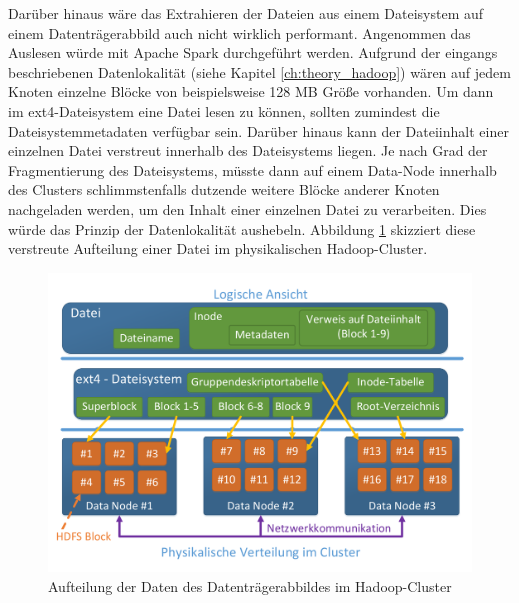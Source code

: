 \noindent
Darüber hinaus wäre das Extrahieren der Dateien aus einem Dateisystem auf einem Datenträgerabbild auch nicht wirklich performant. Angenommen das Auslesen würde mit Apache Spark durchgeführt werden. Aufgrund der eingangs beschriebenen Datenlokalität (siehe Kapitel \ref{ch:theory_hadoop}) wären auf jedem Knoten einzelne Blöcke von beispielsweise 128 MB Größe vorhanden. Um dann im ext4-Dateisystem eine Datei lesen zu können, sollten zumindest die Dateisystemmetadaten verfügbar sein. Darüber hinaus kann der Dateiinhalt einer einzelnen Datei verstreut innerhalb des Dateisystems liegen. Je nach Grad der Fragmentierung des Dateisystems, müsste dann auf einem Data-Node innerhalb des Clusters schlimmstenfalls dutzende weitere Blöcke anderer Knoten nachgeladen werden, um den Inhalt einer einzelnen Datei zu verarbeiten. Dies würde das Prinzip der Datenlokalität aushebeln. Abbildung \ref{fig:ext4_to_hdfs} skizziert diese verstreute Aufteilung einer Datei im physikalischen Hadoop-Cluster.\\ 
\begin{figure}[ht]
  \centering
  \includegraphics[width=\textwidth]{./resource/ext4_to_hdfs.pdf}
  \caption{Aufteilung der Daten des Datenträgerabbildes im Hadoop-Cluster}
  \label{fig:ext4_to_hdfs}
\end{figure}

